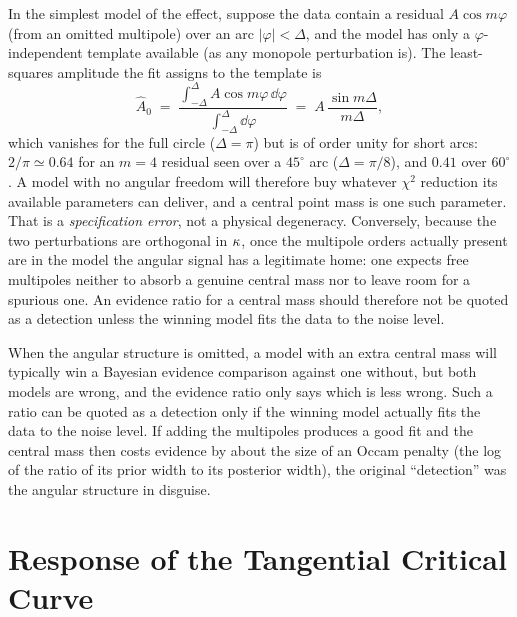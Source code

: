 In the simplest model of the effect, suppose the data contain a residual
$A\cos m\varphi$ (from an omitted multipole) over an arc
$|\varphi|<\Delta$, and the model has only a $\varphi$-independent
template available (as any monopole perturbation is).  The
least-squares amplitude the fit assigns to the template is
\begin{equation}
    \hat A_0 \;=\; \frac{\int_{-\Delta}^{\Delta}A\cos m\varphi\,\dd\varphi}
                       {\int_{-\Delta}^{\Delta}\dd\varphi}
    \;=\; A\,\frac{\sin m\Delta}{m\Delta},
    \label{eq:mu_arc_overlap}
\end{equation}
which vanishes for the full circle ($\Delta=\pi$) but is of order unity
for short arcs: $2/\pi\simeq0.64$ for an $m=4$ residual seen over a
$45^\circ$ arc ($\Delta=\pi/8$), and $0.41$ over $60^\circ$.  A model
with no angular freedom will therefore buy whatever $\chi^2$
reduction its available parameters can deliver, and a central point
mass is one such parameter.  That is a \emph{specification error},
not a physical degeneracy.  Conversely, because the two perturbations
are orthogonal in $\kappa$, once the multipole orders actually
present are in the model
the angular signal has a legitimate home: one expects free multipoles
neither to absorb a genuine central mass nor to leave room for a
spurious one.  An evidence ratio for a central mass should therefore
not be quoted as a detection unless the winning model fits the data to
the noise level.

\begin{annotation}
When the angular structure is omitted, a model with an extra central
mass will typically win a Bayesian evidence comparison against one
without, but both models are wrong, and the evidence ratio only says
which is less wrong.  Such a ratio can be quoted as a detection only
if the winning model actually fits the data to the noise level.  If
adding the multipoles produces a good fit and the central mass then
costs evidence by about the size of an Occam
penalty (the log of the ratio of its prior width to its posterior
width), the original ``detection'' was the angular structure in
disguise.
\end{annotation}


\section{Response of the Tangential Critical Curve}
\label{sec:mu_critical}


